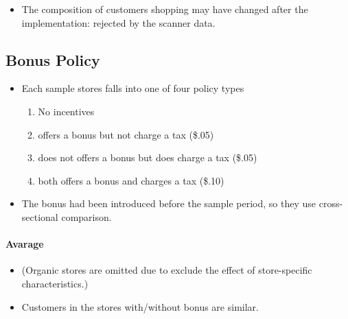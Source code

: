 \documentclass[../root]{subfiles}
\begin{document}
\begin{itemize}
\begin{itemize}
\begin{figure}[ht]
        \end{figure}
      \end{itemize}
      \item The composition of customers shopping may have changed after the implementation: rejected by the scanner data.
    \end{itemize}

    \subsection{Bonus Policy}

    \begin{itemize}
      \item Each sample stores falls into one of four policy types
      \begin{enumerate}
        \item No incentives
        \item offers a bonus but not charge a tax (\$.05)
        \item does not offers a bonus but does charge a tax (\$.05)
        \item both offers a bonus and charges a tax (\$.10)
      \end{enumerate}
      \item The bonus had been introduced before the sample period, so they use cross-sectional comparison.
    \end{itemize}

    \paragraph{Avarage}

    \begin{itemize}
      \item (Organic stores are omitted due to exclude the effect of store-specific characteristics.)
      \item Customers in the stores with/without bonus are similar.
    \end{itemize}
\end{document}
